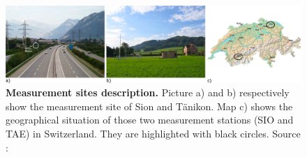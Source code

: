 \documentclass[a4paper, 12pt]{article}
\begin{document}
    \begin{figure}[b]
        \centering
        \includegraphics[width = 1 \textwidth]{Figures/Locations.png}
        \caption{\textbf{Measurement sites description.} Picture a) and b) respectively show the measurement site of Sion and Tänikon. Map c) shows the geographical situation of those two measurement stations (SIO and TAE) in Switzerland. They are highlighted with black circles. Source : \cite{NABEL}}
        \label{location_fig}
    \end{figure}
    
\end{document}
